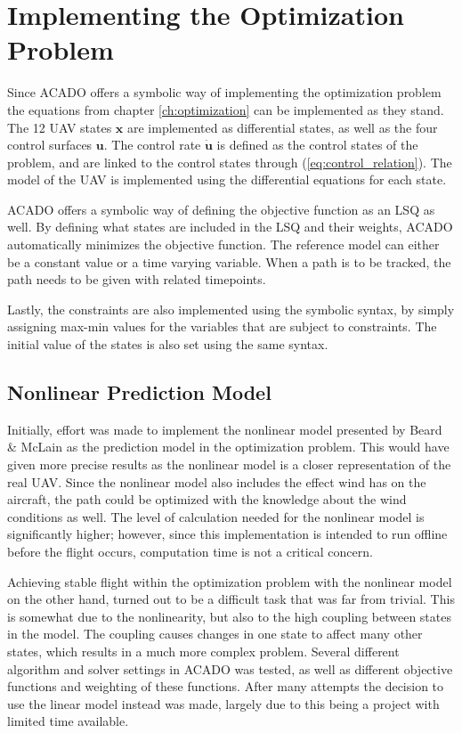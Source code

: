 \section[Optimization Problem]{Implementing the Optimization Problem}

Since ACADO offers a symbolic way of implementing the optimization problem the equations from chapter \ref{ch:optimization} can be implemented as they stand. The 12 UAV states $\mathbf{x}$ are implemented as differential states, as well as the four control surfaces $\mathbf{u}$. The control rate $\mathbf{\dot{u}}$ is defined as the control states of the problem, and are linked to the control states through (\ref{eq:control_relation}). The model of the UAV is implemented using the differential equations for each state.

ACADO offers a symbolic way of defining the objective function as an LSQ as well. By defining what states are included in the LSQ and their weights, ACADO automatically minimizes the objective function. The reference model can either be a constant value or a time varying variable. When a path is to be tracked, the path needs to be given with related timepoints.

Lastly, the constraints are also implemented using the symbolic syntax, by simply assigning max-min values for the variables that are subject to constraints. The initial value of the states is also set using the same syntax. 


\subsection{Nonlinear Prediction Model}

Initially, effort was made to implement the nonlinear model presented by Beard \& McLain \cite{uavBEARD} as the prediction model in the optimization problem. This would have given more precise results as the nonlinear model is a closer representation of the real UAV. Since the nonlinear model also includes the effect wind has on the aircraft, the path could be optimized with the knowledge about the wind conditions as well. The level of calculation needed for the nonlinear model is significantly higher; however, since this implementation is intended to run offline before the flight occurs, computation time is not a critical concern.

Achieving stable flight within the optimization problem with the nonlinear model on the other hand, turned out to be a difficult task that was far from trivial. This is somewhat due to the nonlinearity, but also to the high coupling between states in the model. The coupling causes changes in one state to affect many other states, which results in a much more complex problem. Several different algorithm and solver settings in ACADO was tested, as well as different objective functions and weighting of these functions. After many attempts the decision to use the linear model instead was made, largely due to this being a project with limited time available.


